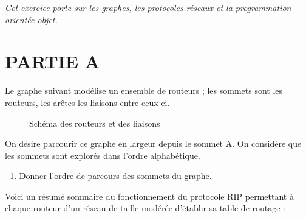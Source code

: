 
\pagestyle{DS_FP}

\bigskip


\emph{Cet exercice porte sur les graphes, les protocoles réseaux et la programmation orientée objet.}

\section*{PARTIE A}


    Le graphe suivant modélise un ensemble de routeurs ; les sommets sont les routeurs, les arêtes les liaisons entre ceux-ci.

\begin{figure}[!h]
\begin{center}
\end{center}
\caption{Schéma des routeurs et des liaisons}\label{reseau_exo1}
\end{figure}

On désire parcourir ce graphe en largeur depuis le sommet A. On considère que les sommets sont explorés dans l'ordre alphabétique.


\begin{enumerate}[series=monDS]
    \item Donner l'ordre de parcours des sommets du graphe.\hfill 

\end{enumerate}

Voici un résumé sommaire du fonctionnement du protocole RIP permettant à chaque routeur d’un réseau de taille modérée d’établir sa table de routage :\par


